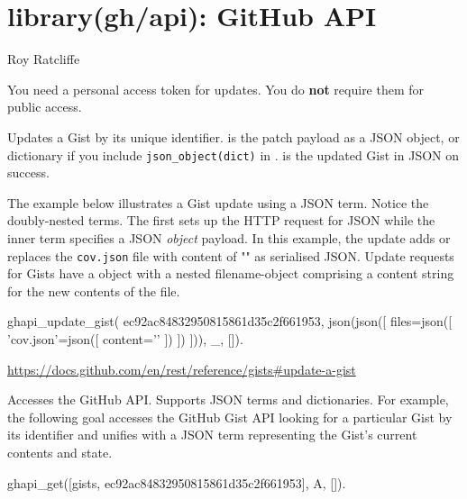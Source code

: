 \chapter{library(gh/api): GitHub API}\label{sec:api}

\begin{tags}
Roy Ratcliffe
\end{tags}

You need a personal access token for updates. You do \textbf{not} require
them for public access.\vspace{0.7cm}

\begin{description}
Updates a Gist by its unique identifier.  is the patch payload
as a JSON object, or dictionary if you include \verb$json_object(dict)$ in
.  is the updated Gist in JSON on success.

The example below illustrates a Gist update using a JSON term.
Notice the doubly-nested  terms. The first sets up the HTTP
request for JSON while the inner term specifies a JSON \textit{object}
payload. In this example, the update adds or replaces the \verb$cov.json$
file with content of "\Scurl{}" as serialised JSON. Update requests for
Gists have a  object with a nested filename-object comprising
a content string for the new contents of the file.

\begin{code}
ghapi_update_gist(
    ec92ac84832950815861d35c2f661953,
    json(json([ files=json([ 'cov.json'=json([ content='{}'
                                             ])
                           ])
              ])), _, []).
\end{code}

\begin{tags}
\url{https://docs.github.com/en/rest/reference/gists#update-a-gist}
\end{tags}

Accesses the GitHub API. Supports JSON terms and dictionaries. For
example, the following goal accesses the GitHub Gist API looking for
a particular Gist by its identifier and unifies  with a JSON term
representing the Gist's current contents and state.

\begin{code}
ghapi_get([gists, ec92ac84832950815861d35c2f661953], A, []).
\end{code}


\end{description}
